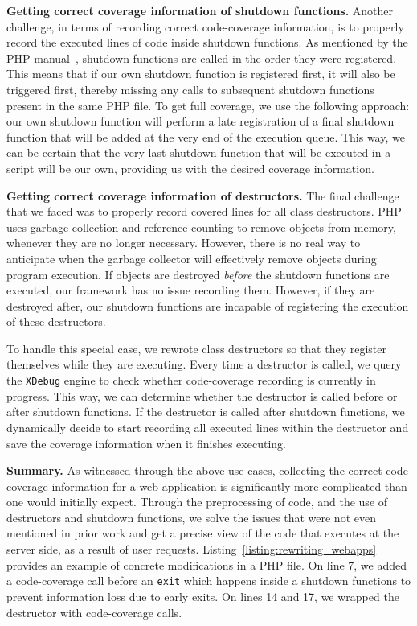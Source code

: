 \vspace{1ex}
\noindent\textbf{Getting correct coverage information of shutdown functions.}
Another challenge, in terms of recording correct code-coverage information,
is to properly record the executed lines of code inside shutdown functions. As
mentioned by the PHP manual~\cite{phpshutdown}, shutdown functions are called
in the order they were registered. This means that if our own shutdown function
is registered first, it will also be triggered first, thereby missing any
calls to subsequent shutdown functions present in the same PHP file. To get
full coverage, we use the following approach: our own shutdown function will
perform a late registration of a final shutdown function that will be added
at the very end of the execution queue. This way, we can be certain that
the very last shutdown function that will be executed in a script will be
our own, providing us with the desired coverage information.


\vspace{1ex}
\noindent\textbf{Getting correct coverage information of destructors.}
The final challenge that we faced was to properly record covered lines for
all class destructors. PHP uses garbage collection and reference counting to
remove objects from memory, whenever they are no longer necessary. However,
there is no real way to anticipate when the garbage collector will effectively
remove objects during program execution. If objects are destroyed \emph{before}
the shutdown functions are executed, our framework has no issue recording
them. However, if they are destroyed after, our shutdown functions are
incapable of registering the execution of these destructors.

To handle this special case, we rewrote class destructors so that they
register themselves while they are executing. Every time a destructor
is called, we query the \texttt{XDebug} engine to check whether code-coverage
recording is currently in progress. This way, we can determine whether the
destructor is called before or after shutdown functions. If the destructor
is called after shutdown functions, we dynamically decide to start recording
all executed lines within the destructor and save the coverage information
when it finishes executing.

\vspace{1ex}
\noindent\textbf{Summary.}
As witnessed through the above use cases, collecting the correct code coverage information
for a web application is significantly more complicated than one would
initially expect. Through the preprocessing of code, and the use of destructors
and shutdown functions, we solve the issues that were not even mentioned
in prior work and get a precise view of the code that executes at the server
side, as a result of user requests. Listing~\ref{listing:rewriting_webapps}
provides an example of concrete modifications in a PHP file. On line 7, we
added a code-coverage call before an \texttt{exit} which happens inside a shutdown functions to prevent information
loss due to early exits. On lines 14 and 17, we wrapped the destructor with
code-coverage calls.


